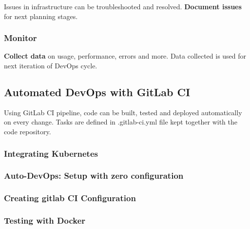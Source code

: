Issues in infrastructure can be troubleshooted and resolved. \textbf{Document issues} for next planning stages. 

\subsubsection{Monitor}
\textbf{Collect data} on usage, performance, errors and more. Data collected is used for next iteration of DevOps cycle.

\subsection{Automated DevOps with GitLab CI}

Using GitLab CI pipeline, code can be built, tested and deployed automatically on every change. 
Tasks are defined in .gitlab-ci.yml file kept together with the code repository. 

\subsubsection{Integrating Kubernetes}

\subsubsection{Auto-DevOps: Setup with zero configuration}

\subsubsection{Creating gitlab CI Configuration}

\subsubsection{Testing with Docker}